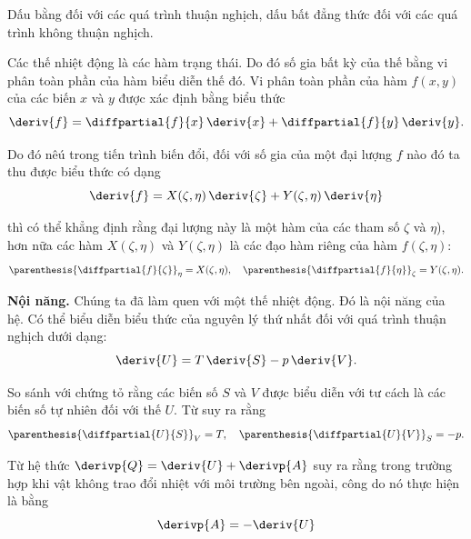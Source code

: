 \noindent
Dấu bằng đối với các quá trình thuận nghịch, dấu bất đẳng thức đối với các quá trình không thuận nghịch.

Các thế nhiệt động là các hàm trạng thái. Do đó số gia bất kỳ của thế bằng vi phân toàn phần của hàm biểu diễn thế đó. Vi phân toàn phần của hàm $f(x, y)$ của các biến $x$ và $y$ được xác định bằng biểu thức
\begin{equation*}
	\deriv{f} = \diffpartial{f}{x}\,\deriv{x} + \diffpartial{f}{y}\,\deriv{y}.
\end{equation*}

\noindent
Do đó nêú trong tiến trình biến đổi, đối với số gia của một đại lượng $f$ nào đó ta thu được biểu thức có dạng
\begin{equation}\label{eq:12_47}
	\deriv{f} = X(\zeta,\eta)\,\deriv{\zeta} + Y(\zeta,\eta)\,\deriv{\eta}
\end{equation}

\noindent
thì có thể khẳng định rằng đại lượng này là một hàm của các tham số $\zeta$ và $\eta$), hơn nữa các hàm $X(\zeta,\eta)$ và $Y(\zeta,\eta)$ là các đạo hàm riêng của hàm $f(\zeta,\eta)$:
\begin{equation}\label{eq:12_48}
	\parenthesis{\diffpartial{f}{\zeta}}_{\eta} = X(\zeta,\eta),\quad \parenthesis{\diffpartial{f}{\eta}}_{\zeta} = Y(\zeta,\eta).
\end{equation}

\textbf{Nội năng.} Chúng ta đã làm quen với một thế nhiệt động. Đó là nội năng của hệ. Có thể biểu diễn biểu thức của nguyên lý thứ nhất đối với quá trình thuận nghịch dưới dạng:
\begin{equation}\label{eq:12_49}
	\deriv{U} = T\,\deriv{S} - p\,\deriv{V}.
\end{equation}

\noindent
So sánh với  chứng tỏ rằng các biến số $S$ và $V$ được biểu diễn với tư cách là các biến số tự nhiên đối với thế $U$. Từ  suy ra rằng
\begin{equation}\label{eq:12_50}
	\parenthesis{\diffpartial{U}{S}}_V = T,\quad 	\parenthesis{\diffpartial{U}{V}}_S = -p.
\end{equation}

Từ hệ thức $\derivp{Q}=\deriv{U}+\derivp{A}$ suy ra rằng trong trường hợp khi vật không trao đổi nhiệt với môi trường bên ngoài, công do nó thực hiện là bằng
\begin{equation*}
	\derivp{A} = -\deriv{U}
\end{equation*}

